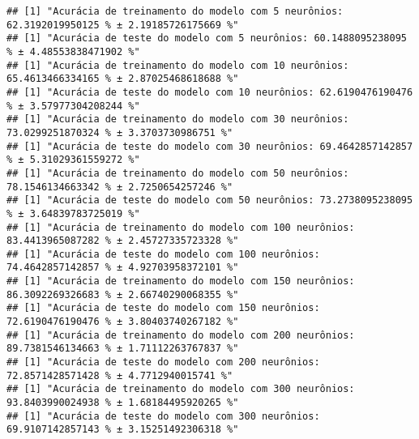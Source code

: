 \documentclass[
]{article}
\newenvironment{Shaded}{\begin{snugshade}}{\end{snugshade}}
\newcommand{\CommentTok}[1]{\textcolor[rgb]{0.56,0.35,0.01}{\textit{#1}}}
\newcommand{\DecValTok}[1]{\textcolor[rgb]{0.00,0.00,0.81}{#1}}
\newcommand{\KeywordTok}[1]{\textcolor[rgb]{0.13,0.29,0.53}{\textbf{#1}}}
\newcommand{\NormalTok}[1]{#1}
\newcommand{\OperatorTok}[1]{\textcolor[rgb]{0.81,0.36,0.00}{\textbf{#1}}}
\newcommand{\StringTok}[1]{\textcolor[rgb]{0.31,0.60,0.02}{#1}}
\begin{document}
\begin{Shaded}
\end{Shaded}

\begin{verbatim}
## [1] "Acurácia de treinamento do modelo com 5 neurônios: 62.3192019950125 % ± 2.19185726175669 %"
## [1] "Acurácia de teste do modelo com 5 neurônios: 60.1488095238095 % ± 4.48553838471902 %"
## [1] "Acurácia de treinamento do modelo com 10 neurônios: 65.4613466334165 % ± 2.87025468618688 %"
## [1] "Acurácia de teste do modelo com 10 neurônios: 62.6190476190476 % ± 3.57977304208244 %"
## [1] "Acurácia de treinamento do modelo com 30 neurônios: 73.0299251870324 % ± 3.3703730986751 %"
## [1] "Acurácia de teste do modelo com 30 neurônios: 69.4642857142857 % ± 5.31029361559272 %"
## [1] "Acurácia de treinamento do modelo com 50 neurônios: 78.1546134663342 % ± 2.7250654257246 %"
## [1] "Acurácia de teste do modelo com 50 neurônios: 73.2738095238095 % ± 3.64839783725019 %"
## [1] "Acurácia de treinamento do modelo com 100 neurônios: 83.4413965087282 % ± 2.45727335723328 %"
## [1] "Acurácia de teste do modelo com 100 neurônios: 74.4642857142857 % ± 4.92703958372101 %"
## [1] "Acurácia de treinamento do modelo com 150 neurônios: 86.3092269326683 % ± 2.66740290068355 %"
## [1] "Acurácia de teste do modelo com 150 neurônios: 72.6190476190476 % ± 3.80403740267182 %"
## [1] "Acurácia de treinamento do modelo com 200 neurônios: 89.7381546134663 % ± 1.71112263767837 %"
## [1] "Acurácia de teste do modelo com 200 neurônios: 72.8571428571428 % ± 4.7712940015741 %"
## [1] "Acurácia de treinamento do modelo com 300 neurônios: 93.8403990024938 % ± 1.68184495920265 %"
## [1] "Acurácia de teste do modelo com 300 neurônios: 69.9107142857143 % ± 3.15251492306318 %"
\end{verbatim}
\end{document}
